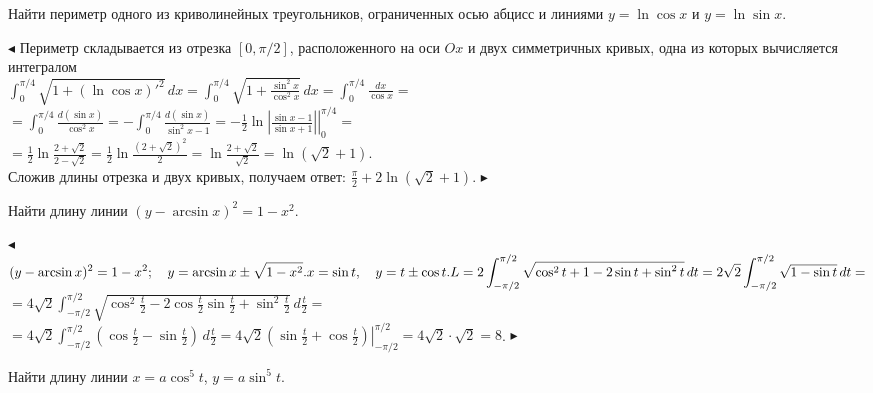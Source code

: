 \documentclass[a5paper,10pt]{article}
\begin{document}
\medskip
{} Найти периметр одного из криволинейных треугольников,
ограниченных осью абцисс и линиями $y=\ln\cos x$ и $y=\ln\sin x$.

\medskip
\noindent $\blacktriangleleft$
Периметр складывается из отрезка $[0,\pi/2]$, расположенного на оси
$Ox$ и двух симметричных кривых, одна из которых вычисляется интегралом\\
$\displaystyle\int_0^{\pi/4} \sqrt{1+(\ln\cos x)'^2}\,dx=
\int_0^{\pi/4} \sqrt{1+\frac{\sin^2 x}{\cos^2 x}}\,dx=
\int_0^{\pi/4} \frac{dx}{\cos x}=$\\
$\displaystyle =\int_0^{\pi/4} \frac{d(\sin x)}{\cos^2 x}=
-\int_0^{\pi/4} \frac{d(\sin x)}{\sin^2 x-1}=
-\left.\frac12\ln\left|\frac{\sin x-1}{\sin x+1}\right|\right|_0^{\pi/4}=$\\
$\displaystyle =\frac12\ln\frac{2+\sqrt2}{2-\sqrt 2}=\frac12\ln\frac{(2+\sqrt2)^2}{2}=
\ln\frac{2+\sqrt2}{\sqrt2}=\ln(\sqrt2+1)$.\\
Сложив длины отрезка и двух кривых, получаем ответ:
$\displaystyle\frac{\pi}{2}+2\ln(\sqrt2+1)$. $\blacktriangleright$

\medskip
{} Найти длину линии $(y-\arcsin x)^2=1-x^2$.

\medskip
\noindent $\blacktriangleleft$
$\displaystyle (y-\arcsin x)^2=1-x^2;\quad y=\arcsin x\pm\sqrt{1-x^2}.
x=\sin t,\quad y=t\pm\cos t.\\
L=2\int_{-\pi/2}^{\pi/2}\sqrt{\cos^2t+1-2\sin t+\sin^2t}\,dt=
2\sqrt2\int_{-\pi/2}^{\pi/2}\sqrt{1-\sin t}\,dt=$\\
$\displaystyle =4\sqrt2\int_{-\pi/2}^{\pi/2}
\sqrt{\cos^2\frac t2-2\cos\frac t2\sin\frac t2+\sin^2\frac t2}\,d\frac t2=$\\
$\displaystyle =4\sqrt2\int_{-\pi/2}^{\pi/2}
\left(\cos\frac t2-\sin\frac t2 \right)\,d\frac t2=
4\sqrt2\left.\left(\sin\frac t2+\cos\frac t2 \right)\right|_{-\pi/2}^{\pi/2}=
4\sqrt2\cdot\sqrt2=8$. $\blacktriangleright$

\medskip
{} Найти длину линии $x=a\cos^5t$, $y=a\sin^5t$.
\end{document}
